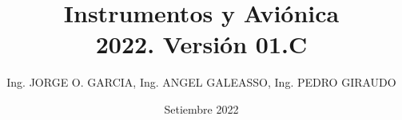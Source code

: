 \documentclass[a4page,12pt,twoside, spanish]{book}
\title{Instrumentos y Avi\'onica \\ 2022. Versi\'on 01.C}
\author{Ing. JORGE O. GARCIA, Ing. ANGEL GALEASSO, Ing. PEDRO GIRAUDO }
\date{Setiembre 2022}
\begin{document}
\renewcommand{\listtablename}{\'Indice de tablas} 
\renewcommand{\tablename}{Tabla}  %

\renewcommand{\appendixtocname}{Ap\'endices}
\renewcommand{\appendixpagename}{Ap\'endices}

\renewcommand{\baselinestretch}{1.5}       %

\setlength{\parindent}{0pt}      %

\clearpage
\thispagestyle{fancy}

\maketitle

\tableofcontents





















\clearpage	%
\printacronyms[name = Acr\'onimos, heading = chapter*]


\clearpage
\printglossaries	%

\clearpage


\clearpage
\renewcommand\bibname{Bibliograf\'ia} %



%


%
%

\begin{appendices}

%
%

\end{appendices}
\end{document}

